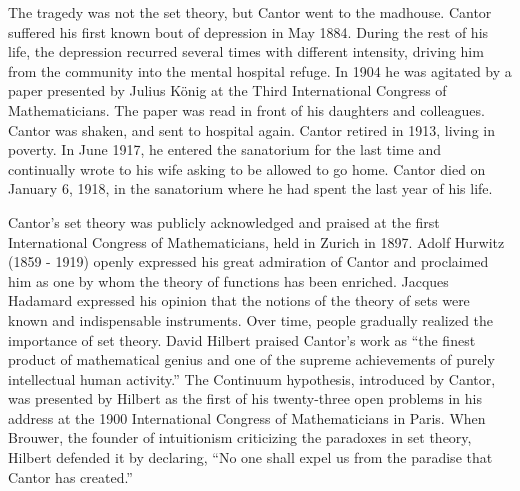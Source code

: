 \documentclass{article}
\begin{document}
The tragedy was not the set theory, but Cantor went to the madhouse. Cantor suffered his first known bout of depression in May 1884. During the rest of his life, the depression recurred several times with different intensity, driving him from the community into the mental hospital refuge. In 1904 he was agitated by a paper presented by Julius König at the Third International Congress of Mathematicians. The paper was read in front of his daughters and colleagues. Cantor was shaken, and sent to hospital again. Cantor retired in 1913, living in poverty. In June 1917, he entered the sanatorium for the last time and continually wrote to his wife asking to be allowed to go home. Cantor died on January 6, 1918, in the sanatorium where he had spent the last year of his life.

Cantor's set theory was publicly acknowledged and praised at the first International Congress of Mathematicians, held in Zurich in 1897. Adolf Hurwitz (1859 - 1919) openly expressed his great admiration of Cantor and proclaimed him as one by whom the theory of functions has been enriched. Jacques Hadamard expressed his opinion that the notions of the theory of sets were known and indispensable instruments. Over time, people gradually realized the importance of set theory. David Hilbert praised Cantor's work as ``the finest product of mathematical genius and one of the supreme achievements of purely intellectual human activity.'' The Continuum hypothesis, introduced by Cantor, was presented by Hilbert as the first of his twenty-three open problems in his address at the 1900 International Congress of Mathematicians in Paris. When Brouwer, the founder of intuitionism criticizing the paradoxes in set theory, Hilbert defended it by declaring, ``No one shall expel us from the paradise that Cantor has created.''
\end{document}
